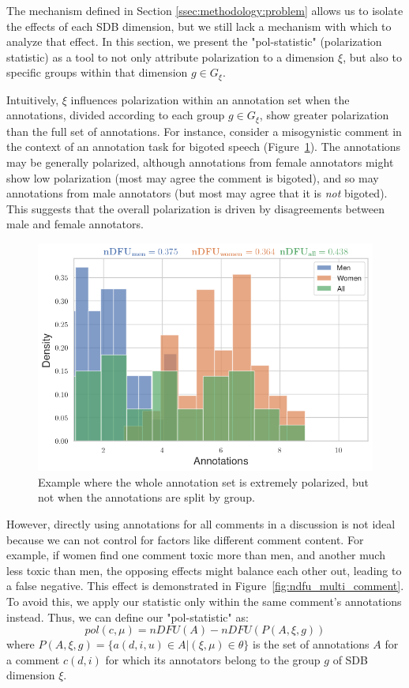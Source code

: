 \documentclass{article}
\begin{document}
The mechanism defined in Section \ref{ssec:methodology:problem} allows us to isolate the effects of each \ac{SDB} dimension, but we still lack a mechanism with which to analyze that effect. In this section, we present the "pol-statistic" (polarization statistic) as a tool to not only attribute polarization to a dimension $\xi$, but also to specific groups within that dimension $g \in G_{\xi}$.

Intuitively, $\xi$ influences polarization within an annotation set when the annotations, divided according to each group $g \in G_{\xi}$, show greater polarization than the full set of annotations. For instance, consider a misogynistic comment in the context of an annotation task for bigoted speech (Figure~\ref{fig:ndfu_single_comment}). The annotations may be generally polarized, although annotations from female annotators might show low polarization (most may agree the comment is bigoted), and so may annotations from male annotators (but most may agree that it is \textit{not} bigoted). This suggests that the overall polarization is driven by disagreements between male and female annotators. 

\begin{figure}
	\centering
	\includegraphics[width=0.8\linewidth]{ndfu_single_comment.png}
	\caption{Example where the whole annotation set is extremely polarized, but not when the annotations are split by group.}
	\label{fig:ndfu_single_comment}
\end{figure}

 However, directly using annotations for all comments in a discussion is not ideal because we can not control for factors like different comment content. For example, if women find one comment toxic more than men, and another much less toxic than men, the opposing effects might balance each other out, leading to a false negative. This effect is demonstrated in Figure~\ref{fig:ndfu_multi_comment}. To avoid this, we apply our statistic only within the same comment’s annotations instead. Thus, we can define our "pol-statistic" as:
\begin{equation}
	pol(c, \mu) = nDFU(A) - nDFU(P(A, \xi, g))
\end{equation}
\noindent where $P(A,\xi, g) = \{a(d, i, u) \in A | (\xi, \mu) \in \theta\}$ is the set of annotations $A$ for a comment $c(d, i)$ for which its annotators belong  to the group $g$ of \ac{SDB} dimension $\xi$.
\end{document}
